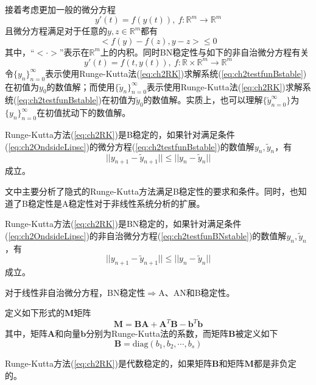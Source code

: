 接着考虑更加一般的微分方程\begin{equation}
y'(t)=f(y(t)),\ f:\mathbb{R}^m\to\mathbb{R}^m\label{eq:ch2testfunBstable}
\end{equation}
且微分方程满足对于任意的$y,z\in\mathbb{R}^m$都有
\begin{equation}
<f(y)-f(z),y-z>\le0\label{eq:ch2OndsideLipsc}
\end{equation}
其中，“$<\cdot>$”表示在$\mathbb{R}^m$上的内积。同时BN稳定性与如下的非自治微分方程有关\begin{equation}
y'(t)=f(t,y(t)),\ f:\mathbb{R}\times \mathbb{R}^m\to\mathbb{R}^m\label{eq:ch2testfunBNstable}
\end{equation}
令$\{y_n\}_{n=0}^\infty$表示使用Runge-Kutta法(\ref{eq:ch2RK})求解系统(\ref{eq:ch2testfunBstable})在初值为$y_0$的数值解；而使用$\{\tilde{y}_n\}_{n=0}^\infty$表示使用Runge-Kutta法(\ref{eq:ch2RK})求解系统(\ref{eq:ch2testfunBstable})在初值为$\tilde{y}_0$的数值解。实质上，也可以理解$\{\tilde{y}_{n=0}^\infty\}$为$\{y_n\}_{n=0}^\infty$在初值扰动下的数值解。
\begin{definition}[B稳定性]
Runge-Kutta方法(\ref{eq:ch2RK})是B稳定的\cite{Butcher1975a,Fatunla1988a}，如果针对满足条件(\ref{eq:ch2OndsideLipsc})的微分方程(\ref{eq:ch2testfunBstable})的数值解$y_n,\tilde{y}_n$，有
\begin{equation}
||y_{n+1}-\tilde{y}_{n+1}||\le||y_n-\tilde{y}_n||
\end{equation}成立。
\end{definition}

文中主要分析了隐式的Runge-Kutta方法满足B稳定性的要求和条件。同时，也知道了B稳定性是A稳定性对于非线性系统分析的扩展。
\begin{definition}[BN稳定性]
Runge-Kutta方法(\ref{eq:ch2RK})是BN稳定的\cite{Butcher1975a,Fatunla1988a}，如果针对满足条件(\ref{eq:ch2OndsideLipsc})的非自治微分方程(\ref{eq:ch2testfunBNstable})的数值解$y_n,\tilde{y}_n$，有
\begin{equation}
||y_{n+1}-\tilde{y}_{n+1}||\le||y_n-\tilde{y}_n||
\end{equation}成立。
\end{definition}

对于线性非自治微分方程，BN稳定性$\Longrightarrow$A、AN和B稳定性。

定义如下形式的$\bm{M}$矩阵
\begin{equation}
\bm{M}=\bm{BA}+\bm{A}^T\bm{B}-\bm{b}^T\bm{b}
\end{equation}
其中，矩阵$\bm{A}$和向量$\bm{b}$分别为Runge-Kutta法的系数，而矩阵$\bm{B}$被定义如下\begin{equation}
\bm{B}=\text{diag}(b_1,b_2,\cdots,b_s)
\end{equation}\vspace{-1.3cm}
\begin{definition}[代数稳定性]
Runge-Kutta方法(\ref{eq:ch2RK})是代数稳定的\cite{Jackiewicz2009a,Fatunla1988a}，如果矩阵$\bm{B}$和矩阵$\bm{M}$都是非负定的。
\end{definition}

